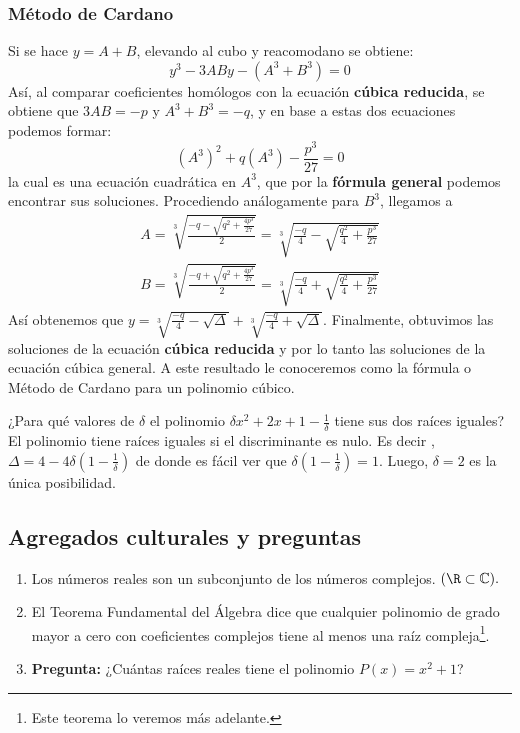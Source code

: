 {    \subsubsection{Método de Cardano}
    {
        Si se hace $y = A + B$, elevando al cubo y reacomodano se obtiene: \[y^3 -3ABy - (A^3 + B^3) = 0\]
        Así, al comparar coeficientes homólogos con la ecuación \textbf{cúbica reducida}, se obtiene que $3AB = - p$ y $A^3 + B^3 = -q$, y en base a estas dos ecuaciones podemos formar:
        \[(A^3)^2 + q(A^3) - \frac{p^3}{27} = 0\] la cual es una ecuación cuadrática en $A^3$, que por la \textbf{fórmula general} podemos encontrar sus soluciones. Procediendo análogamente para $B^3$, llegamos a
        \begin{gather*}
            A = \sqrt[3]{\frac{-q - \sqrt{q^2 + \frac{4p^3}{27}}}{2}} = \sqrt[3]{\frac{-q}{4} - \sqrt{\frac{q^2}{4} + \frac{p^3}{27}}}\\
            B = \sqrt[3]{\frac{-q + \sqrt{q^2 + \frac{4p^3}{27}}}{2}} = \sqrt[3]{\frac{-q}{4} + \sqrt{\frac{q^2}{4} + \frac{p^3}{27}}}
        \end{gather*}
        Así obtenemos que $y = \sqrt[3]{\frac{-q}{4} - \sqrt{\Delta}} + \sqrt[3]{\frac{-q}{4} + \sqrt{\Delta}}$. Finalmente, obtuvimos las soluciones de la ecuación \textbf{cúbica reducida} y por lo tanto las soluciones de la ecuación cúbica general.
        A este resultado le conoceremos como la fórmula o Método de Cardano para un polinomio cúbico.
    }

    \begin{example}
        ¿Para qué valores de $\delta$ el polinomio $\delta x^2 + 2x + 1 - \frac{1}{\delta}$ tiene sus dos raíces iguales?
        \solution
        {
            El polinomio tiene raíces iguales si el discriminante es nulo. Es decir , $\Delta = 4 - 4\delta (1 - \frac{1}{\delta})$ de donde es fácil ver que $\delta (1 - \frac{1}{\delta}) = 1.$ Luego, $\delta = 2$ es la única posibilidad.
        }
    \end{example}
}
\label{subsec:determinar-raices}

\subsection{Agregados culturales y preguntas}
{
    \begin{enumerate}
        \item Los números reales son un subconjunto de los números complejos. $(\R \subset \mathbb{C}).$
        \item El Teorema Fundamental del Álgebra dice que cualquier polinomio de grado mayor a cero con coeficientes complejos tiene al menos una raíz compleja\footnote{Este teorema lo veremos más adelante.}.
        \item \textbf{Pregunta:} ¿Cuántas raíces reales tiene el polinomio $P(x) = x^2+1$?
    \end{enumerate}
}\label{subsec:agregados-culturales}

